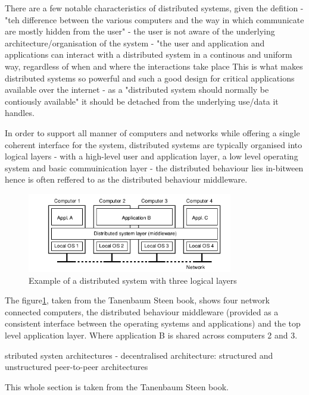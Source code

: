 \documentclass[a4paper]{article}
\begin{document}
There are a few notable characteristics of distributed systems, given the defition
- "teh difference between the various computers and the way in which communicate are mostly hidden from the user"
- the user is not aware of the underlying architecture/organisation of the system
- "the user and application and applications can interact with a distributed system in a continous and uniform way, regardless of when and where the interactions take place
This is what makes distributed systems so powerful and such a good design for critical applications available over the internet - as a "distributed system should normally be contiously available" it should be detached from the underlying use/data it handles.

In order to support all manner of computers and networks while offering a single coherent interface for the system, distributed systems are typically organised into logical layers - with a high-level user and application layer, a low level operating system and basic commuinication layer - the distributed behaviour lies in-bitween hence is often reffered to as the distributed behaviour middleware.

\begin{figure}
    \centering
    \includegraphics[width=0.8\textwidth]{imgs/Screenshot from 2022-01-17 17-13-57.png}
    \caption{Example of a distributed system with three logical layers}
    \label{fig:example-distributed-system-layers}
\end{figure}

The figure\ref{fig:example-distributed-system-layers}, taken from the Tanenbaum Steen book, shows four network connected computers, the distributed behaviour middleware (provided as a consistent interface between the operating systems and applications) and the top level application layer. Where application B is shared across computers 2 and 3.

stributed systen architectures - decentralised architecture: structured and unstructured peer-to-peer architectures



This whole section is taken from the Tanenbaum Steen book\cite{tanenbaumSteen}. %
\end{document}
